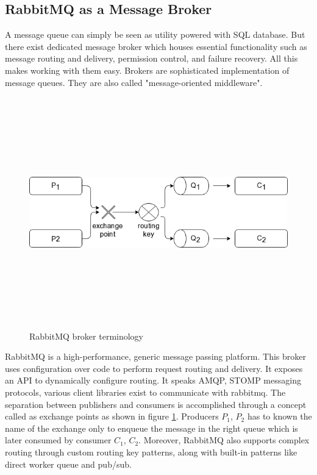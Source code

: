 \subsection{RabbitMQ as a Message Broker}
A message queue\cite{asyncmsg} can simply be seen as utility powered with SQL database. But there exist dedicated message
broker which houses essential functionality such as message routing and delivery, permission control, and
failure recovery. All this makes working with them easy. Brokers are sophisticated implementation of
message queues. They are also called "message-oriented middleware".
\begin{figure}[h!]
  \centering
  \includegraphics[width=14cm,height=10cm,keepaspectratio]{../media/crawler/rmq_exchange.png}
  \caption{RabbitMQ broker terminology \cite{asyncmsg}}
  \label{fig:mqexchange}
\end{figure}

\noindent
RabbitMQ\cite{asyncmsg} is a high-performance, generic message passing platform. This broker uses configuration over code
to perform request routing and delivery. It exposes an API to dynamically configure routing. It speaks
AMQP, STOMP messaging protocols, various client libraries exist to communicate with rabbitmq. The
separation between publishers and consumers is accomplished through a concept called as exchange points as
shown in figure \ref{fig:mqexchange}. Producers $P_1$, $P_2$ has to known the name of the exchange only to
enqueue the message in the right queue which is later consumed by consumer $C_1$, $C_2$. Moreover, RabbitMQ
also supports complex routing through custom routing key patterns, along with built-in patterns like
direct worker queue and pub/sub.